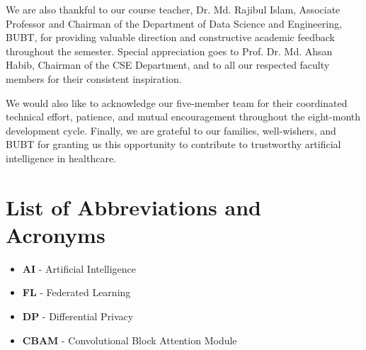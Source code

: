 \documentclass[12pt,a4paper]{report}
\begin{document}
We are also thankful to our course teacher, Dr. Md. Rajibul Islam, Associate Professor and Chairman of the Department of Data Science and Engineering, BUBT, for providing valuable direction and constructive academic feedback throughout the semester. Special appreciation goes to Prof. Dr. Md. Ahsan Habib, Chairman of the CSE Department, and to all our respected faculty members for their consistent inspiration.

We would also like to acknowledge our five-member team for their coordinated technical effort, patience, and mutual encouragement throughout the eight-month development cycle. Finally, we are grateful to our families, well-wishers, and BUBT for granting us this opportunity to contribute to trustworthy artificial intelligence in healthcare.


\tableofcontents
\clearpage

\clearpage
\listoftables
\clearpage
\chapter*{List of Abbreviations and Acronyms}

\begin{itemize}
    \item \textbf{AI} - Artificial Intelligence
    \item \textbf{FL} - Federated Learning
    \item \textbf{DP} - Differential Privacy
    \item \textbf{CBAM} - Convolutional Block Attention Module
\end{itemize}
\clearpage
{}
\setcounter{page}{1}
\end{document}
